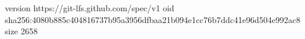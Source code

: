 version https://git-lfs.github.com/spec/v1
oid sha256:4080b885c404816737b95a3956dfbaa21b094e1cc76b7ddc41e96d504e992ac8
size 2658
